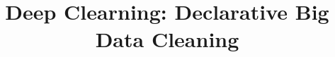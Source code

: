 \documentclass[english]{sig-alternate}
\begin{document}

\linespread{1}%

\title{Deep Clearning: Declarative Big Data Cleaning} 


\iffalse
\author{\alignauthor Sanjay Krishnan,~~Jiannan Wang,~~Sameer Agarwal,~~Michael J. Franklin,~~Ken Goldberg \\
\vspace{.2em}\affaddr{AMPLab, UC Berkeley} \\
\fontsize{9}{10}\selectfont\ttfamily\upshape
\vspace{.1em}\{sanjay,jnwang\}@eecs.berkeley.edu, \{sameerag,franklin\}@cs.berkeley.edu, goldberg@berkeley.edu
}
\fi




\newtheorem{theorem}{Theorem}
\newtheorem{example}{Example}
\newtheorem{definition}{Definition}
\newtheorem{proposition}{Proposition}
\newtheorem{lemma}{Lemma}
\newtheorem{corollary}{Corollary}
\newtheorem{demonstration}{Demonstration}

\newcommand{\dataset}{data set\xspace}
\newcommand{\datasets}{data sets\xspace}
\newcommand{\biascorrected}{NormalizedSC\xspace}
\newcommand{\bias}{\biascorrected}
\newcommand{\sampledirty}{{SampleDirty}\xspace}
\newcommand{\sampleclean}{{RawSC}\xspace}
\newcommand{\allclean}{{AllClean}\xspace}
\newcommand{\alldirty}{{AllDirty}\xspace}
\newcommand{\sys}{\textsf{DeepClearner}\xspace}
\newcommand{\projx}{\sys}
\newcommand{\saqp}{SAQP\xspace}
\newcommand{\saqpplus}{\projx}
\newcommand{\blinkdb}{BlinkDB\xspace}
\newcommand{\ctable}{\ensuremath{T^{clean}}\xspace}
\newcommand{\var}{\ensuremath{\texttt{var}}\xspace}
\end{document}

